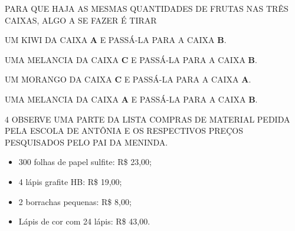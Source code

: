 


PARA QUE HAJA AS MESMAS QUANTIDADES DE FRUTAS NAS TRÊS CAIXAS, ALGO
A SE FAZER É TIRAR

\begin{escolha}
\item UM KIWI DA CAIXA \textbf{A} E PASSÁ-LA PARA A CAIXA \textbf{B}.

\item UMA MELANCIA DA CAIXA \textbf{C} E PASSÁ-LA PARA A CAIXA \textbf{B}.

\item UM MORANGO DA CAIXA \textbf{C} E PASSÁ-LA PARA A CAIXA \textbf{A}.

\item UMA MELANCIA DA CAIXA \textbf{A} E PASSÁ-LA PARA A CAIXA \textbf{B}.
\end{escolha}




\num{4} OBSERVE UMA PARTE DA LISTA COMPRAS DE MATERIAL PEDIDA PELA ESCOLA DE ANTÔNIA E OS RESPECTIVOS PREÇOS PESQUISADOS PELO PAI DA MENINDA.

\begin{itemize}
  \item 300 folhas de papel sulfite: R\$ 23,00;
  \item 4 lápis grafite HB: R\$ 19,00;
  \item 2 borrachas pequenas: R\$ 8,00;
  \item Lápis de cor com 24 lápis: R\$ 43,00.
\end{itemize}

